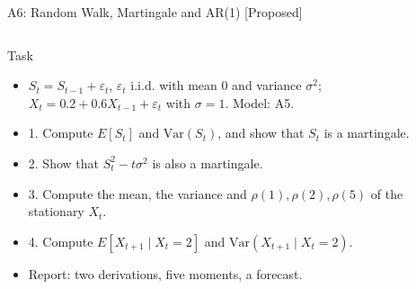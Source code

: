 \begin{frame}{A6: Random Walk, Martingale and AR(1) [Proposed]}
\propsub
\itemsize{\scriptsize}
\begin{columns}[T]
\begin{column}{\taskw}
\begin{block}{Task}
\begin{itemize}
    \item $S_t = S_{t-1} + \varepsilon_t$, $\varepsilon_t$ i.i.d. with mean 0 and variance $\sigma^2$; $X_t = 0.2 + 0.6X_{t-1} + \varepsilon_t$ with $\sigma = 1$. Model: A5.
    \item 1. Compute $E[S_t]$ and $\text{Var}(S_t)$, and show that $S_t$ is a martingale.
    \item 2. Show that $S_t^2 - t\sigma^2$ is also a martingale.
    \item 3. Compute the mean, the variance and $\rho(1), \rho(2), \rho(5)$ of the stationary $X_t$.
    \item 4. Compute $E[X_{t+1} \mid X_t = 2]$ and $\text{Var}(X_{t+1} \mid X_t = 2)$.
    \item Report: two derivations, five moments, a forecast.
\end{itemize}
\end{block}
\end{column}
\begin{column}{\solw}
\end{column}
\end{columns}
\end{frame}

